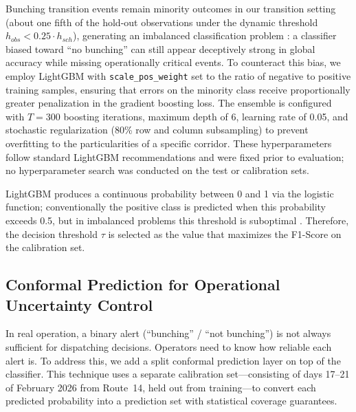 \documentclass[fleqn,10pt,lineno]{wlpeerj}
\begin{document}
Bunching transition events remain minority outcomes in our transition setting (about one fifth of the hold-out observations under the dynamic threshold $h_{obs} < 0.25 \cdot h_{sch}$), generating an imbalanced classification problem \citep{16}: a classifier biased toward
``no bunching'' can still appear deceptively strong in global accuracy while missing operationally critical events. To
counteract this bias, we employ LightGBM \citep{32} with \texttt{scale\_pos\_weight} set to the ratio of negative to positive training samples, ensuring that errors on the minority class receive proportionally greater penalization in the gradient boosting loss. The ensemble is configured with $T=300$ boosting iterations, maximum depth of 6, learning rate of 0.05, and stochastic regularization (80\% row and column subsampling) to prevent overfitting to the particularities of a specific corridor. These hyperparameters follow standard LightGBM recommendations \citep{32} and were fixed prior to evaluation; no hyperparameter search was conducted on the test or calibration sets.

LightGBM produces a continuous probability between 0 and 1 via the logistic function;
conventionally the positive class is predicted when this probability exceeds 0.5, but in
imbalanced problems this threshold is suboptimal \citep{17}. Therefore, the decision
threshold $\tau$ is selected as
the value that maximizes the F1-Score on the calibration set.

\subsection{Conformal Prediction for Operational Uncertainty Control}

In real operation, a binary alert (``bunching'' / ``not bunching'') is not always sufficient
for dispatching decisions. Operators need to know how reliable each alert is. To address this,
we add a split conformal prediction layer on top of the classifier. This technique uses a
separate calibration set---consisting of days 17--21 of February 2026 from Route~14, held out
from training---to convert each predicted probability into a prediction set with statistical
coverage guarantees.
\end{document}
